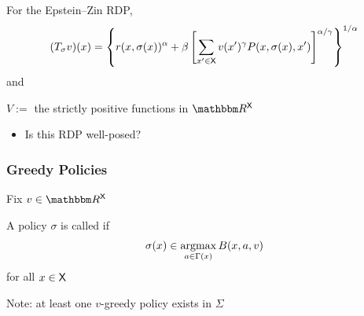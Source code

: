 \documentclass[dvipsnames]{beamer}
\begin{document}
\begin{frame}
    
    \Eg For the Epstein--Zin RDP, 
    \begin{equation*}
        (T_\sigma v)(x) 
        =
        \left\{
            r(x, \sigma(x))^\alpha + \beta 
                \left[
                    \sum_{x' \in \mathsf X} v(x')^\gamma P(x,\sigma(x), x')
                \right]^{\alpha / \gamma}
        \right\}^{1/\alpha}
    \end{equation*}
    and 
    \begin{center}
        $V := $ the strictly positive functions in $\RR^\Xsf$ 
    \end{center}


    \vspace{0.5em}
    \vspace{0.5em}

    \begin{itemize}
        \item Is this RDP well-posed?
    \end{itemize}

\end{frame}


\begin{frame}
    \frametitle{Greedy Policies}

    Fix $v \in \RR^\Xsf$ 
    
    \vspace{0.5em}
    \vspace{0.5em}
    A policy $\sigma$ is called  if
    \begin{equation*}
        \sigma(x)
        \in \argmax_{a \in \Gamma(x)}
            B(x, a, v)
    \end{equation*}
    for all $x \in \mathsf X$

    \vspace{0.5em}
    \vspace{0.5em}
    \vspace{0.5em}
    \vspace{0.5em}
    Note: at least one $v$-greedy policy exists in $\Sigma$


\end{frame}
\end{document}
